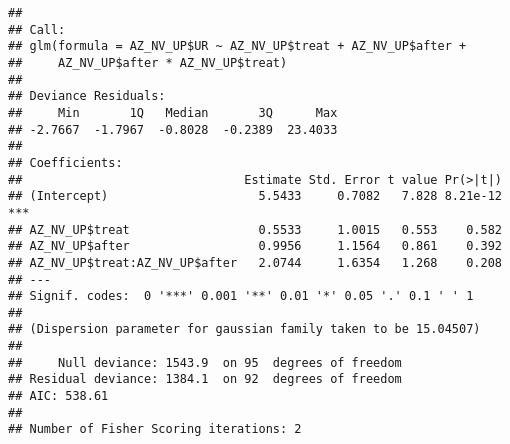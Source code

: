 \documentclass[
]{article}
\newenvironment{Shaded}{\begin{snugshade}}{\end{snugshade}}
\newcommand{\CommentTok}[1]{\textcolor[rgb]{0.56,0.35,0.01}{\textit{#1}}}
\newcommand{\FunctionTok}[1]{\textcolor[rgb]{0.00,0.00,0.00}{#1}}
\newcommand{\NormalTok}[1]{#1}
\newcommand{\OtherTok}[1]{\textcolor[rgb]{0.56,0.35,0.01}{#1}}
\newcommand{\SpecialCharTok}[1]{\textcolor[rgb]{0.00,0.00,0.00}{#1}}
\begin{document}
\begin{Shaded}
\end{Shaded}

\begin{verbatim}
## 
## Call:
## glm(formula = AZ_NV_UP$UR ~ AZ_NV_UP$treat + AZ_NV_UP$after + 
##     AZ_NV_UP$after * AZ_NV_UP$treat)
## 
## Deviance Residuals: 
##     Min       1Q   Median       3Q      Max  
## -2.7667  -1.7967  -0.8028  -0.2389  23.4033  
## 
## Coefficients:
##                               Estimate Std. Error t value Pr(>|t|)    
## (Intercept)                     5.5433     0.7082   7.828 8.21e-12 ***
## AZ_NV_UP$treat                  0.5533     1.0015   0.553    0.582    
## AZ_NV_UP$after                  0.9956     1.1564   0.861    0.392    
## AZ_NV_UP$treat:AZ_NV_UP$after   2.0744     1.6354   1.268    0.208    
## ---
## Signif. codes:  0 '***' 0.001 '**' 0.01 '*' 0.05 '.' 0.1 ' ' 1
## 
## (Dispersion parameter for gaussian family taken to be 15.04507)
## 
##     Null deviance: 1543.9  on 95  degrees of freedom
## Residual deviance: 1384.1  on 92  degrees of freedom
## AIC: 538.61
## 
## Number of Fisher Scoring iterations: 2
\end{verbatim}
\end{document}

